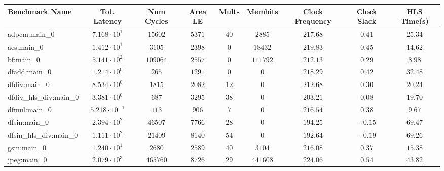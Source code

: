 \begin{tabular}{|l|c|c|c|c|c|c|c|c|}
\hline
Benchmark Name          & Tot. Latency            & Num Cycles & Area LE   & Mults   & Membits    & Clock Frequency & Clock Slack & HLS Time(s) \\
\hline
adpcm:main\_0           & $ 7.168 \cdot 10^{1}  $ & $ 15602  $ & $ 5371  $ & $ 40  $ & $ 2885   $ & $ 217.68      $ & $ 0.41    $ & $ 25.34   $ \\
aes:main\_0             & $ 1.412 \cdot 10^{1}  $ & $ 3105   $ & $ 2398  $ & $ 0   $ & $ 18432  $ & $ 219.83      $ & $ 0.45    $ & $ 14.62   $ \\
bf:main\_0              & $ 5.141 \cdot 10^{2}  $ & $ 109064 $ & $ 2557  $ & $ 0   $ & $ 111792 $ & $ 212.13      $ & $ 0.29    $ & $ 8.98    $ \\
dfadd:main\_0           & $ 1.214 \cdot 10^{0}  $ & $ 265    $ & $ 1291  $ & $ 0   $ & $ 0      $ & $ 218.29      $ & $ 0.42    $ & $ 32.48   $ \\
dfdiv:main\_0           & $ 8.534 \cdot 10^{0}  $ & $ 1815   $ & $ 2082  $ & $ 12  $ & $ 0      $ & $ 212.68      $ & $ 0.30    $ & $ 20.24   $ \\
dfdiv\_hls\_div:main\_0 & $ 3.381 \cdot 10^{0}  $ & $ 687    $ & $ 3295  $ & $ 38  $ & $ 0      $ & $ 203.21      $ & $ 0.08    $ & $ 19.70   $ \\
dfmul:main\_0           & $ 5.218 \cdot 10^{-1} $ & $ 113    $ & $ 906   $ & $ 7   $ & $ 0      $ & $ 216.54      $ & $ 0.38    $ & $ 9.67    $ \\
dfsin:main\_0           & $ 2.394 \cdot 10^{2}  $ & $ 46507  $ & $ 7766  $ & $ 28  $ & $ 0      $ & $ 194.25      $ & $ -0.15   $ & $ 69.47   $ \\
dfsin\_hls\_div:main\_0 & $ 1.111 \cdot 10^{2}  $ & $ 21409  $ & $ 8140  $ & $ 54  $ & $ 0      $ & $ 192.64      $ & $ -0.19   $ & $ 69.26   $ \\
gsm:main\_0             & $ 1.240 \cdot 10^{1}  $ & $ 2680   $ & $ 2589  $ & $ 40  $ & $ 3104   $ & $ 216.08      $ & $ 0.37    $ & $ 15.38   $ \\
jpeg:main\_0            & $ 2.079 \cdot 10^{3}  $ & $ 465760 $ & $ 8726  $ & $ 29  $ & $ 441608 $ & $ 224.06      $ & $ 0.54    $ & $ 43.82   $ \\

\end{tabular}
